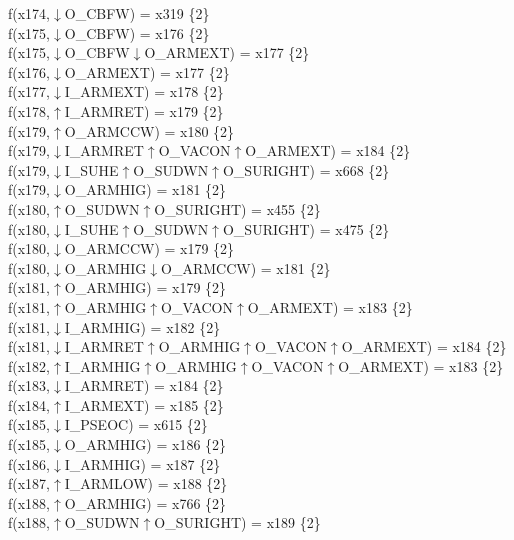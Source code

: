 f(x174,$\downarrow$O\_CBFW) = x319 \{2\} \\  
f(x175,$\downarrow$O\_CBFW) = x176 \{2\} \\  
f(x175,$\downarrow$O\_CBFW$\downarrow$O\_ARMEXT) = x177 \{2\} \\  
f(x176,$\downarrow$O\_ARMEXT) = x177 \{2\} \\  
f(x177,$\downarrow$I\_ARMEXT) = x178 \{2\} \\  
f(x178,$\uparrow$I\_ARMRET) = x179 \{2\} \\  
f(x179,$\uparrow$O\_ARMCCW) = x180 \{2\} \\  
f(x179,$\downarrow$I\_ARMRET$\uparrow$O\_VACON$\uparrow$O\_ARMEXT) = x184 \{2\} \\  
f(x179,$\downarrow$I\_SUHE$\uparrow$O\_SUDWN$\uparrow$O\_SURIGHT) = x668 \{2\} \\  
f(x179,$\downarrow$O\_ARMHIG) = x181 \{2\} \\  
f(x180,$\uparrow$O\_SUDWN$\uparrow$O\_SURIGHT) = x455 \{2\} \\  
f(x180,$\downarrow$I\_SUHE$\uparrow$O\_SUDWN$\uparrow$O\_SURIGHT) = x475 \{2\} \\  
f(x180,$\downarrow$O\_ARMCCW) = x179 \{2\} \\  
f(x180,$\downarrow$O\_ARMHIG$\downarrow$O\_ARMCCW) = x181 \{2\} \\  
f(x181,$\uparrow$O\_ARMHIG) = x179 \{2\} \\  
f(x181,$\uparrow$O\_ARMHIG$\uparrow$O\_VACON$\uparrow$O\_ARMEXT) = x183 \{2\} \\  
f(x181,$\downarrow$I\_ARMHIG) = x182 \{2\} \\  
f(x181,$\downarrow$I\_ARMRET$\uparrow$O\_ARMHIG$\uparrow$O\_VACON$\uparrow$O\_ARMEXT) = x184 \{2\} \\  
f(x182,$\uparrow$I\_ARMHIG$\uparrow$O\_ARMHIG$\uparrow$O\_VACON$\uparrow$O\_ARMEXT) = x183 \{2\} \\  
f(x183,$\downarrow$I\_ARMRET) = x184 \{2\} \\  
f(x184,$\uparrow$I\_ARMEXT) = x185 \{2\} \\  
f(x185,$\downarrow$I\_PSEOC) = x615 \{2\} \\  
f(x185,$\downarrow$O\_ARMHIG) = x186 \{2\} \\  
f(x186,$\downarrow$I\_ARMHIG) = x187 \{2\} \\  
f(x187,$\uparrow$I\_ARMLOW) = x188 \{2\} \\  
f(x188,$\uparrow$O\_ARMHIG) = x766 \{2\} \\  
f(x188,$\uparrow$O\_SUDWN$\uparrow$O\_SURIGHT) = x189 \{2\} \\  
